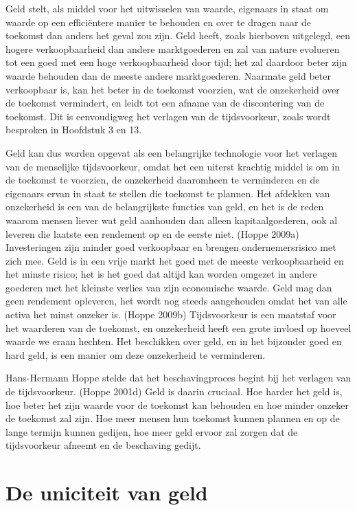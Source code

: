 \documentclass[
  a5paper,
  smalldemyvopaper,11pt,twoside,onecolumn,openright,extrafontsizes,
hidelinks]{memoir}
\begin{document}
Geld stelt, als middel voor het uitwisselen van waarde, eigenaars in
staat om waarde op een efficiëntere manier te behouden en over te dragen
naar de toekomst dan anders het geval zou zijn. Geld heeft, zoals
hierboven uitgelegd, een hogere verkoopbaarheid dan andere marktgoederen
en zal van nature evolueren tot een goed met een hoge verkoopbaarheid
door tijd; het zal daardoor beter zijn waarde behouden dan de meeste
andere marktgoederen. Naarmate geld beter verkoopbaar is, kan het beter
in de toekomst voorzien, wat de onzekerheid over de toekomst vermindert,
en leidt tot een afname van de discontering van de toekomst. Dit is
eenvoudigweg het verlagen van de tijdsvoorkeur, zoals wordt besproken in
Hoofdstuk 3 en 13.

Geld kan dus worden opgevat als een belangrijke technologie voor het
verlagen van de menselijke tijdsvoorkeur, omdat het een uiterst krachtig
middel is om in de toekomst te voorzien, de onzekerheid daaromheen te
verminderen en de eigenaars ervan in staat te stellen die toekomst te
plannen. Het afdekken van onzekerheid is een van de belangrijkste
functies van geld, en het is de reden waarom mensen liever wat geld
aanhouden dan alleen kapitaalgoederen, ook al leveren die laatste een
rendement op en de eerste niet. (Hoppe 2009a) Investeringen zijn minder
goed verkoopbaar en brengen ondernemersrisico met zich mee. Geld is in
een vrije markt het goed met de meeste verkoopbaarheid en het minste
risico; het is het goed dat altijd kan worden omgezet in andere goederen
met het kleinste verlies van zijn economische waarde. Geld mag dan geen
rendement opleveren, het wordt nog steeds aangehouden omdat het van alle
activa het minst onzeker is. (Hoppe 2009b) Tijdsvoorkeur is een maatstaf
voor het waarderen van de toekomst, en onzekerheid heeft een grote
invloed op hoeveel waarde we eraan hechten. Het beschikken over geld, en
in het bijzonder goed en hard geld, is een manier om deze onzekerheid te
verminderen.

Hans-Hermann Hoppe stelde dat het beschavingproces begint bij het
verlagen van de tijdsvoorkeur. (Hoppe 2001d) Geld is daarin cruciaal.
Hoe harder het geld is, hoe beter het zijn waarde voor de toekomst kan
behouden en hoe minder onzeker de toekomst zal zijn. Hoe meer mensen hun
toekomst kunnen plannen en op de lange termijn kunnen gedijen, hoe meer
geld ervoor zal zorgen dat de tijdsvoorkeur afneemt en de beschaving
gedijt.

\section{De uniciteit van geld}\label{de-uniekheid-van-geld}
\end{document}
